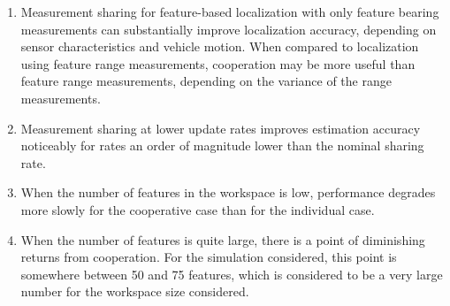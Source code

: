 \documentclass{aiaa-tc}
\begin{document}
\begin{enumerate}
\item Measurement sharing for feature-based localization with only feature bearing measurements can substantially improve localization accuracy, depending on sensor characteristics and vehicle motion. When compared to localization using feature range measurements, cooperation may be more useful than feature range measurements, depending on the variance of the range measurements.
\item Measurement sharing at lower update rates improves estimation accuracy noticeably for rates an order of magnitude lower than the nominal sharing rate.
\item When the number of features in the workspace is low, performance degrades more slowly for the cooperative case than for the individual case.
\item When the number of features is quite large, there is a point of diminishing returns from cooperation. For the simulation considered, this point is somewhere between 50 and 75 features, which is considered to be a very large number for the workspace size considered.
\end{enumerate}



\end{document}
